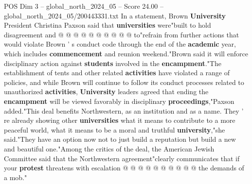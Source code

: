 \begin{textsample}{POS Dim 3 – global\_north\_2024\_05 – Score 24.00 – global\_north\_2024\_05/200443331.txt}
In a statement, Brown \textbf{University} President Christina Paxson said that \textbf{universities} were"built to hold disagreement and @ @ @ @ @ @ @ @ @ @ to"refrain from further actions that would violate Brown ' s conduct code through the end of the \textbf{academic} year, which includes \textbf{commencement} and reunion weekend."Brown said it will enforce disciplinary action against \textbf{students} involved in the \textbf{encampment}."The establishment of tents and other related \textbf{activities} have violated a range of policies, and while Brown will continue to follow its conduct processes related to unauthorized \textbf{activities}, \textbf{University} leaders agreed that ending the \textbf{encampment} will be viewed favorably in disciplinary \textbf{proceedings},"Paxson added."This deal benefits Northwestern, as an institution and as a name.
They ' re already showing other \textbf{universities} what it means to contribute to a more peaceful world, what it means to be a moral and truthful \textbf{university},"she said."They have an option now not to just build a reputation but build a new and beautiful one."Among the critics of the deal, the American Jewish Committee said that the Northwestern agreement"clearly communicates that if your \textbf{protest} threatens with escalation @ @ @ @ @ @ @ @ @ @ the demands of a mob."

\end{textsample}
